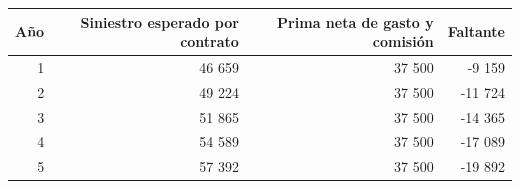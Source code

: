 \begin{tabular}{rrrr}
\toprule
Año & Siniestro esperado por contrato & Prima neta de gasto y comisión & Faltante \\
\midrule
1 & 46 659 & 37 500 & -9 159 \\
2 & 49 224 & 37 500 & -11 724 \\
3 & 51 865 & 37 500 & -14 365 \\
4 & 54 589 & 37 500 & -17 089 \\
5 & 57 392 & 37 500 & -19 892 \\
\bottomrule
\end{tabular}
